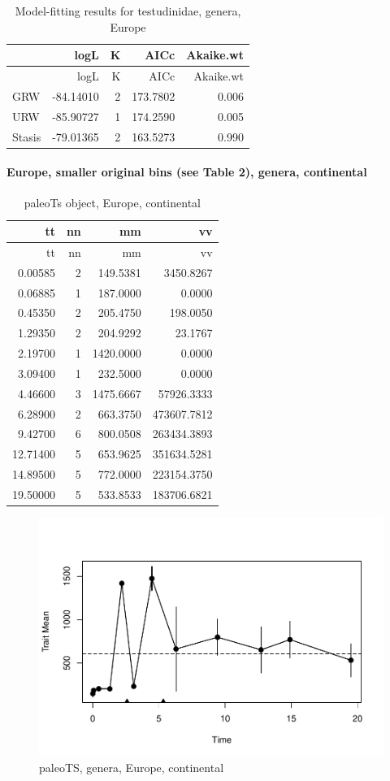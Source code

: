 \documentclass[]{article}
\let\oldparagraph\paragraph
\renewcommand{\paragraph}[1]{\oldparagraph{#1}\mbox{}}
\begin{document}
\begin{longtable}[]{@{}lrrrr@{}}
\caption{Model-fitting results for testudinidae, genera,
Europe}\tabularnewline
\toprule
& logL & K & AICc & Akaike.wt\tabularnewline
\midrule
\endfirsthead
\toprule
& logL & K & AICc & Akaike.wt\tabularnewline
\midrule
\endhead
GRW & -84.14010 & 2 & 173.7802 & 0.006\tabularnewline
URW & -85.90727 & 1 & 174.2590 & 0.005\tabularnewline
Stasis & -79.01365 & 2 & 163.5273 & 0.990\tabularnewline
\bottomrule
\end{longtable}

\newpage

\paragraph{Europe, smaller original bins (see Table 2), genera,
continental}\label{europe-smaller-original-bins-see-table-2-genera-continental}

\begin{longtable}[]{@{}rrrr@{}}
\caption{paleoTs object, Europe, continental}\tabularnewline
\toprule
tt & nn & mm & vv\tabularnewline
\midrule
\endfirsthead
\toprule
tt & nn & mm & vv\tabularnewline
\midrule
\endhead
0.00585 & 2 & 149.5381 & 3450.8267\tabularnewline
0.06885 & 1 & 187.0000 & 0.0000\tabularnewline
0.45350 & 2 & 205.4750 & 198.0050\tabularnewline
1.29350 & 2 & 204.9292 & 23.1767\tabularnewline
2.19700 & 1 & 1420.0000 & 0.0000\tabularnewline
3.09400 & 1 & 232.5000 & 0.0000\tabularnewline
4.46600 & 3 & 1475.6667 & 57926.3333\tabularnewline
6.28900 & 2 & 663.3750 & 473607.7812\tabularnewline
9.42700 & 6 & 800.0508 & 263434.3893\tabularnewline
12.71400 & 5 & 653.9625 & 351634.5281\tabularnewline
14.89500 & 5 & 772.0000 & 223154.3750\tabularnewline
19.50000 & 5 & 533.8533 & 183706.6821\tabularnewline
\bottomrule
\end{longtable}

\begin{figure}[htbp]
\centering
\includegraphics{MA_JJ_files/figure-latex/pTSEuC-1.pdf}
\caption{paleoTS, genera, Europe, continental}
\end{figure}
\end{document}
